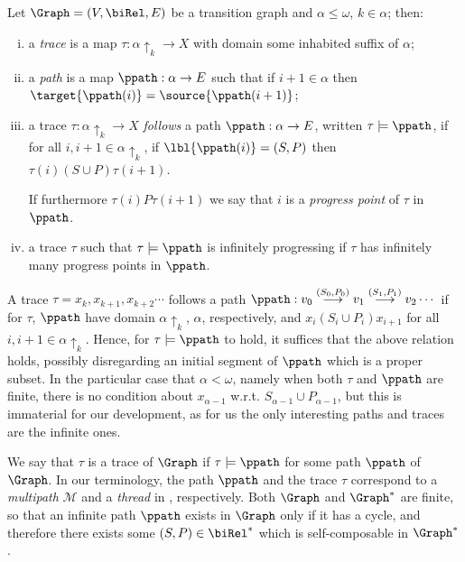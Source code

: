 \begin{definition}\label{def:TracePath}
Let $\Graph = (V, \biRel, E)$ be a transition graph and $\alpha \leq \omega$, $k \in \alpha$; 
then:
\begin{enumerate}[i)]
\item 
a {\em trace} is a map $\tau:\alpha\uparrow_k \to X$ with domain some inhabited 
suffix of $\alpha$;

\item 
a {\em path} is a map $\ppath:\alpha \to E$ such that if $i + 1 \in \alpha$ then 
$\target{\ppath(i)} = \source{\ppath(i+1)}$;

\item 
a trace $\tau:\alpha\uparrow_k \to X$ {\em follows} a path $\ppath: \alpha \to E$,
written $\tau \models \ppath$, if for all $i,i+1 \in \alpha\uparrow_k$,
if $\lbl{\ppath(i)} = (S,P)$ then $\tau(i) (S \cup P) \tau(i + 1)$.

If furthermore $\tau(i) P \tau(i + 1)$ 
we say that $i$ is a {\em progress point} of $\tau$ in $\ppath$.

\item 
a trace $\tau$ such that $\tau\models \ppath$ 
is infinitely progressing if $\tau$ has infinitely many progress points in $\ppath$.
\end{enumerate}
\end{definition}


\begin{remark}
A trace $\tau = x_k, x_{k+1}, x_{k+2} \cdots$ follows a path $\ppath: v_0 \stackrel{(S_0,P_0)}{\longrightarrow} v_1 \stackrel{(S_1,P_1)}{\longrightarrow} v_2 \cdots$
if for $\tau$, $\ppath$ have domain $\alpha\uparrow_k$, $\alpha$, respectively, 
and $x_i (S_i \cup P_i) x_{i+1}$ for all $i, i+1 \in \alpha\uparrow_k$. 
Hence, for $\tau\models\ppath$ to hold, it suffices that the above relation holds, possibly disregarding an initial segment of $\ppath$ which is a proper subset.
In the particular case that $\alpha < \omega$, namely when both $\tau$ and $\ppath$ are finite, there is no condition about $x_{\alpha - 1}$ w.r.t. $S_{\alpha - 1} \cup P_{\alpha - 1}$, but this is immaterial for our development, 
as for us the only interesting paths and traces are the infinite ones.
\end{remark}

We say that $\tau$ is a trace of $\Graph$ if 
$\tau \models \ppath$ for some path $\ppath$ of $\Graph$.
In our terminology, the path $\ppath$ and the trace $\tau$ correspond to a {\em multipath} $\mathcal{M}$ and a {\em thread} in \cite{Lee1}, respectively.
Both $\Graph$ and $\Graph^*$ are finite, so that an infinite path $\ppath$ exists in $\Graph$ only if it has a cycle, and therefore there exists
some $(S,P) \in \biRel^*$ which is self-composable in $\Graph^*$.

